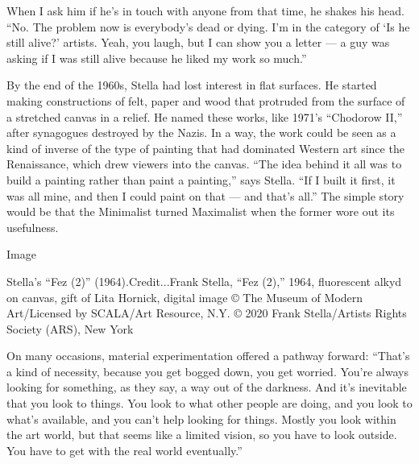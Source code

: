When I ask him if he's in touch with anyone from that time, he shakes
his head. ``No. The problem now is everybody's dead or dying. I'm in the
category of `Is he still alive?' artists. Yeah, you laugh, but I can
show you a letter --- a guy was asking if I was still alive because he
liked my work so much.''

By the end of the 1960s, Stella had lost interest in flat surfaces. He
started making constructions of felt, paper and wood that protruded from
the surface of a stretched canvas in a relief. He named these works,
like 1971's ``Chodorow II,'' after synagogues destroyed by the Nazis. In
a way, the work could be seen as a kind of inverse of the type of
painting that had dominated Western art since the Renaissance, which
drew viewers into the canvas. ``The idea behind it all was to build a
painting rather than paint a painting,'' says Stella. ``If I built it
first, it was all mine, and then I could paint on that --- and that's
all.'' The simple story would be that the Minimalist turned Maximalist
when the former wore out its usefulness.

Image

Stella's ``Fez (2)'' (1964).Credit...Frank Stella, ``Fez (2),'' 1964,
fluorescent alkyd on canvas, gift of Lita Hornick, digital image © The
Museum of Modern Art/Licensed by SCALA/Art Resource, N.Y. © 2020 Frank
Stella/Artists Rights Society (ARS), New York

On many occasions, material experimentation offered a pathway forward:
``That's a kind of necessity, because you get bogged down, you get
worried. You're always looking for something, as they say, a way out of
the darkness. And it's inevitable that you look to things. You look to
what other people are doing, and you look to what's available, and you
can't help looking for things. Mostly you look within the art world, but
that seems like a limited vision, so you have to look outside. You have
to get with the real world eventually.''

